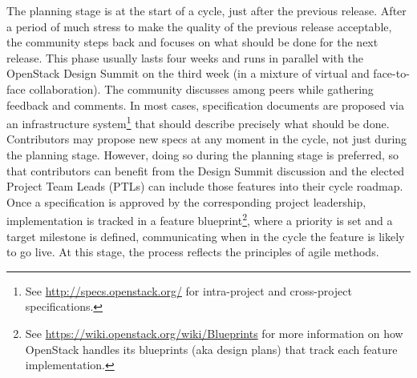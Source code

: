 The planning stage is at the start of a cycle, just after the previous release. After a period of much stress to make the quality of the previous release acceptable, the community steps back and focuses on what should be done for the next release. This phase usually lasts four weeks and runs in parallel with the OpenStack Design Summit on the third week (in a mixture of virtual and face-to-face collaboration). The community discusses among peers while gathering feedback and comments. In most cases, specification documents are proposed via an infrastructure system\footnote{See \url{http://specs.openstack.org/} for intra-project and cross-project specifications.}  that should describe precisely what should be done. Contributors may propose new specs at any moment in the cycle, not just during the planning stage. However, doing so during the planning stage is preferred, so that contributors can benefit from the Design Summit discussion and the elected Project Team Leads (PTLs) can include those features into their cycle roadmap. Once a specification is  approved by the corresponding project leadership, implementation is tracked in a feature blueprint\footnote{See \url{https://wiki.openstack.org/wiki/Blueprints} for more information on how OpenStack handles its blueprints (aka design plans) that track each feature implementation.}, where a priority is set and a target milestone is defined, communicating when in the cycle the feature is likely to go live. At this stage, the process reflects the principles of agile methods. 

